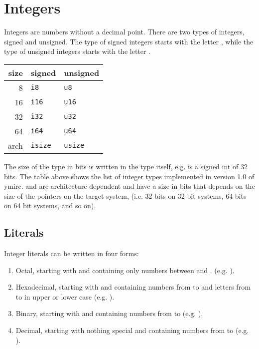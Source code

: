 \section{Integers}
\label{sec:orga8b7d2e}

Integers are numbers without a decimal point. There are two types of integers,
signed and unsigned. The type of signed integers starts with the letter
, while the type of unsigned integers starts with the letter
.

\begin{center}
  \begin{tabular}{|r|ll|}
    \hline
    size & signed & unsigned\\[0pt]
    \hline
    \hline
    8 & \texttt{i8} & \texttt{u8}\\[0pt]
    16 & \texttt{i16} & \texttt{u16}\\[0pt]
    32 & \texttt{i32} & \texttt{u32}\\[0pt]
    64 & \texttt{i64} & \texttt{u64}\\[0pt]
    arch & \texttt{isize} & \texttt{usize}\\[0pt]
    \hline
  \end{tabular}
\end{center}

The size of the type in bits is written in the type itself, e.g.  is
a signed int of 32 bits. The table above shows the list of integer types
implemented in version 1.0 of ymirc.  and  are
architecture dependent and have a size in bits that depends on the size of the
pointers on the target system, (i.e. 32 bits on 32 bit systems, 64 bits on 64
bit systems, and so on).



\subsection{Literals}
\label{sec:org2cf045d}

Integer literals can be written in four forms:

\begin{enumerate}
  \setlength\itemsep{-4pt}
\item Octal, starting with  and containing only numbers between  and . (e.g. ).
\item Hexadecimal, starting with  and containing numbers from
   to  and letters from  to  in upper or
  lower case (e.g. ).
\item Binary, starting with  and containing numbers from  to
   (e.g. ).
\item Decimal, starting with nothing special and containing numbers from
   to  (e.g. ).
\end{enumerate}


